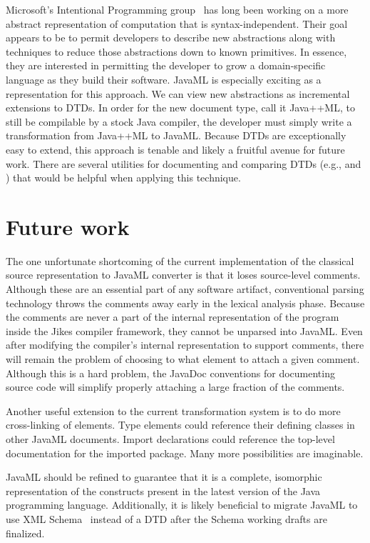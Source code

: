 \documentclass{article}
\begin{document}
\begin{multicols}{2}
Microsoft's Intentional Programming group~\cite{Simonyi96} has long been
working on a more abstract representation of computation that is
syntax-independent.  Their goal appears to be to permit developers to
describe new abstractions along with techniques to reduce those
abstractions down to known primitives.  In essence, they are interested
in permitting the developer to grow a domain-specific language as they
build their software.  JavaML is especially exciting as a representation
for this approach.  We can view new abstractions as incremental
extensions to DTDs.  In order for the new document type, call it
Java++ML, to still be compilable by a stock Java compiler, the developer
must simply write a transformation from Java++ML to JavaML.  Because
DTDs are exceptionally easy to extend, this approach is tenable and
likely a fruitful avenue for future work.  There are several utilities
for documenting and comparing DTDs (e.g.,  and
) that would be helpful when applying this technique.


\section{Future work}
\label{sec-future}

The one unfortunate shortcoming of the current implementation of the
classical source representation to JavaML converter is that it loses
source-level comments.  Although these are an essential part of any
software artifact, conventional parsing technology throws the comments
away early in the lexical analysis phase.  Because the comments are
never a part of the internal representation of the program inside the
Jikes compiler framework, they cannot be unparsed into JavaML.  Even
after modifying the compiler's internal representation to support
comments, there will remain the problem of choosing to what element to
attach a given comment.  Although this is a hard problem, the JavaDoc
conventions for documenting source code will simplify properly attaching
a large fraction of the comments.

Another useful extension to the current transformation system is to do
more cross-linking of elements.  Type elements could reference their
defining classes in other JavaML documents.  Import declarations could
reference the top-level documentation for the imported package.  Many
more possibilities are imaginable.

JavaML should be refined to guarantee that it is a complete, isomorphic
representation of the constructs present in the latest version of the
Java programming language.  Additionally, it is likely beneficial to
migrate JavaML to use XML Schema~\cite{XMLSchema1,XMLSchema2} instead of
a DTD after the Schema working drafts are finalized.


\end{multicols}
\end{document}
